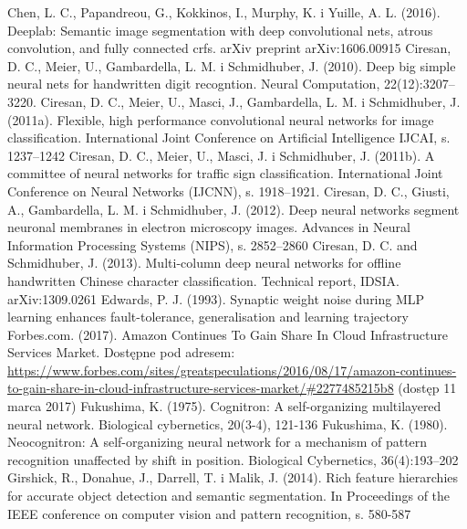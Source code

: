 \documentclass[12pt,a4paper,twoside]{article}
\begin{document}
\begin{thebibliography}{99}
 Chen, L. C., Papandreou, G., Kokkinos, I., Murphy, K. i Yuille, A. L. (2016). Deeplab: Semantic image segmentation with deep convolutional nets, atrous convolution, and fully connected crfs. arXiv preprint arXiv:1606.00915
 Ciresan, D. C., Meier, U., Gambardella, L. M. i Schmidhuber, J. (2010). Deep big simple neural nets for handwritten digit recogntion. Neural Computation, 22(12):3207–3220.
 Ciresan, D. C., Meier, U., Masci, J., Gambardella, L. M. i Schmidhuber, J. (2011a). Flexible, high performance convolutional neural networks for image classification. International Joint Conference on Artificial Intelligence IJCAI, s. 1237–1242
 Ciresan, D. C., Meier, U., Masci, J. i Schmidhuber, J. (2011b). A committee of neural networks for traffic sign classification. International Joint Conference on Neural Networks (IJCNN), s. 1918–1921.
 Ciresan, D. C., Giusti, A., Gambardella, L. M. i Schmidhuber, J. (2012). Deep neural networks segment neuronal membranes in electron microscopy images. Advances in Neural Information Processing Systems (NIPS), s. 2852–2860
 Ciresan, D. C. and Schmidhuber, J. (2013). Multi-column deep neural networks for offline handwritten Chinese character classification. Technical report, IDSIA. arXiv:1309.0261
 Edwards, P. J. (1993). Synaptic weight noise during MLP learning enhances fault-tolerance, generalisation and learning trajectory
 Forbes.com. (2017). Amazon Continues To Gain Share In Cloud Infrastructure Services Market. Dostępne pod adresem: \url{https://www.forbes.com/sites/greatspeculations/2016/08/17/amazon-continues-to-gain-share-in-cloud-infrastructure-services-market/#2277485215b8} (dostęp 11 marca 2017)
 Fukushima, K. (1975). Cognitron: A self-organizing multilayered neural network. Biological cybernetics, 20(3-4), 121-136
 Fukushima, K. (1980). Neocognitron: A self-organizing neural network for a mechanism of pattern
recognition unaffected by shift in position. Biological Cybernetics, 36(4):193–202
 Girshick, R., Donahue, J., Darrell, T. i Malik, J. (2014). Rich feature hierarchies for accurate object detection and semantic segmentation. In Proceedings of the IEEE conference on computer vision and pattern recognition, s. 580-587

\end{thebibliography}
\end{document}
